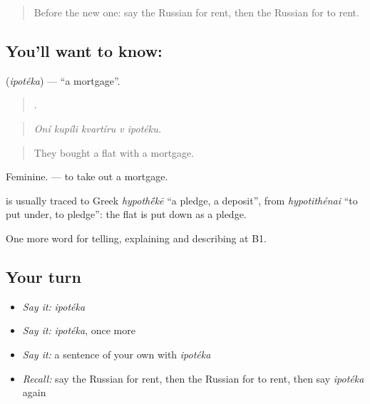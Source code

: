 \label{lesson:RU-C398-ipoteka}



\begin{quote}
Before the new one: say the Russian for rent, then the Russian for to rent.
\end{quote}

\subsection*{You'll want to know: }
\textbf{} (\emph{ipotéka}) — \textquotedblleft{}a mortgage\textquotedblright{}.

\begin{quote}
    .
\end{quote}

\begin{quote}
\emph{Oní kupíli kvartíru v ipotéku.}
\end{quote}

\begin{quote}
They bought a flat with a mortgage.
\end{quote}

Feminine. \emph{ } — to take out a mortgage.

\begin{cousinweb}
\textbf{} is usually traced to Greek \emph{hypoth\'{\={e}}kē} \textquotedblleft{}a pledge, a deposit\textquotedblright{}, from \emph{hypotithénai} \textquotedblleft{}to put under, to pledge\textquotedblright{}: the flat is put down as a pledge.
\end{cousinweb}

\begin{grammarlens}[title={What you've built}]
One more word for telling, explaining and describing at B1.
\end{grammarlens}

\subsection*{Your turn}
\begin{itemize}
\raggedright
  \item \emph{Say it:} \emph{ipotéka}
  \item \emph{Say it:} \emph{ipotéka}, once more
  \item \emph{Say it:} a sentence of your own with \emph{ipotéka}
  \item \emph{Recall:} say the Russian for rent, then the Russian for to rent, then say \emph{ipotéka} again
\end{itemize}

